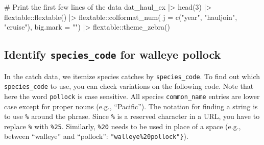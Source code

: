 \documentclass[
  letterpaper,
  oneside,
  open=any]{scrbook}
\newenvironment{Shaded}{\begin{snugshade}}{\end{snugshade}}
\newcommand{\AttributeTok}[1]{\textcolor[rgb]{0.40,0.45,0.13}{#1}}
\newcommand{\CommentTok}[1]{\textcolor[rgb]{0.37,0.37,0.37}{#1}}
\newcommand{\DecValTok}[1]{\textcolor[rgb]{0.68,0.00,0.00}{#1}}
\newcommand{\FunctionTok}[1]{\textcolor[rgb]{0.28,0.35,0.67}{#1}}
\newcommand{\NormalTok}[1]{\textcolor[rgb]{0.00,0.23,0.31}{#1}}
\newcommand{\SpecialCharTok}[1]{\textcolor[rgb]{0.37,0.37,0.37}{#1}}
\newcommand{\StringTok}[1]{\textcolor[rgb]{0.13,0.47,0.30}{#1}}
\begin{document}
\begin{Shaded}
\begin{Highlighting}[]
\CommentTok{\# Print the first few lines of the data }
\NormalTok{dat\_haul\_ex }\SpecialCharTok{|\textgreater{}} 
  \FunctionTok{head}\NormalTok{(}\DecValTok{3}\NormalTok{) }\SpecialCharTok{|\textgreater{}} 
\NormalTok{  flextable}\SpecialCharTok{::}\FunctionTok{flextable}\NormalTok{() }\SpecialCharTok{|\textgreater{}}
\NormalTok{  flextable}\SpecialCharTok{::}\FunctionTok{colformat\_num}\NormalTok{(}
      \AttributeTok{j =} \FunctionTok{c}\NormalTok{(}\StringTok{"year"}\NormalTok{, }\StringTok{"hauljoin"}\NormalTok{, }\StringTok{"cruise"}\NormalTok{), }
      \AttributeTok{big.mark =} \StringTok{""}\NormalTok{) }\SpecialCharTok{|\textgreater{}} 
\NormalTok{  flextable}\SpecialCharTok{::}\FunctionTok{theme\_zebra}\NormalTok{()}
\end{Highlighting}
\end{Shaded}

\subsection{\texorpdfstring{Identify \texttt{species\_code} for walleye
pollock}{Identify species\_code for walleye pollock}}\label{identify-species_code-for-walleye-pollock}

In the catch data, we itemize species catches by \texttt{species\_code}.
To find out which \texttt{species\_code} to use, you can check
variations on the following code. Note that here the word
\texttt{pollock} is case sensitive. All species \texttt{common\_name}
entries are lower case except for proper nouns (e.g., ``Pacific''). The
notation for finding a string is to use \texttt{\%} around the phrase.
Since \texttt{\%} is a reserved character in a URL, you have to replace
\texttt{\%} with \texttt{\%25}. Similarly, \texttt{\%20} needs to be
used in place of a space (e.g., between ``walleye'' and ``pollock'':
\texttt{"walleye\%20pollock"\}\textquotesingle{}}).
\end{document}
